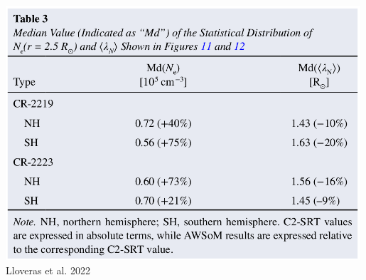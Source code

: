 \documentclass{beamer}
\begin{document}
{{\begin{columns}
\begin{center}
\includegraphics[width=0.99\textwidth]{figuras/table3_lloveras_2022.png}
Lloveras et al. 2022
\end{center}

\end{columns}
}
}


\end{document}
